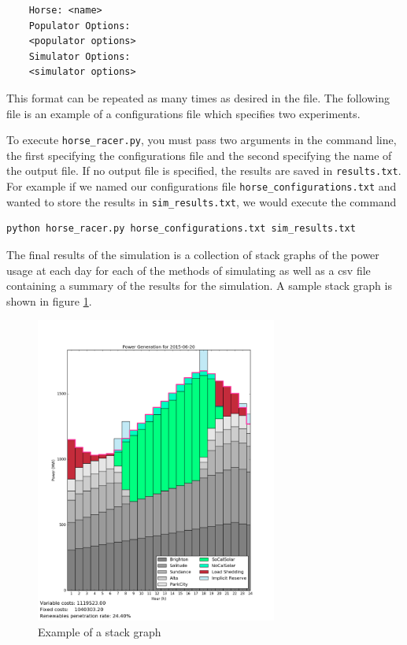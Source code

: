 \documentclass[11pt]{article}
\begin{document}
\begin{verbatim}
	Horse: <name>
	Populator Options:
	<populator options>
	Simulator Options:
	<simulator options>
\end{verbatim}

This format can be repeated as many times as desired in the file. The following file is an example of a configurations file which specifies two experiments.

\begin{framed}
	
\end{framed}


To execute \texttt{horse\_racer.py}, you must pass two arguments in the command line, the first specifying the configurations file and the second specifying the name of the output file. If no output file is specified, the results are saved in \texttt{results.txt}. For example if we named our configurations file \texttt{horse\_configurations.txt} and wanted to store the results in \texttt{sim\_results.txt}, we would execute the command

\begin{verbatim}
python horse_racer.py horse_configurations.txt sim_results.txt
\end{verbatim}

The final results of the simulation is a collection of stack graphs of the power usage at each day for each of the methods of simulating as well as a csv file containing a summary of the results for the simulation. A sample stack graph is shown in figure \ref{fig:example_stack_graph}.

\begin{figure}[h]
	\includegraphics[width=300px]{stackgraph_2015-06-20.png}
	\caption{Example of a stack graph}
	\label{fig:example_stack_graph}
\end{figure}
\end{document}
